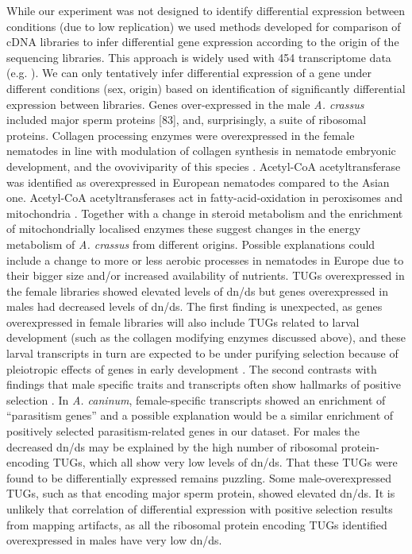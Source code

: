 \documentclass[10pt]{bmc_article}
\newenvironment{bmcformat}{\begin{raggedright}\baselineskip20pt\sloppy\setboolean{publ}{false}}{\end{raggedright}\baselineskip20pt\sloppy}
\begin{document}
\begin{bmcformat}
While our experiment was not designed to identify differential
expression between conditions (due to low replication) we used methods
developed for comparison of cDNA libraries \cite{pmid9331369} to infer
differential gene expression according to the origin of the sequencing
libraries. This approach is widely used with 454 transcriptome data
(e.g. \cite{pmid20470405}). We can only tentatively infer differential
expression of a gene under different conditions (sex, origin) based on
identification of significantly differential expression between
libraries. Genes over-expressed in the male \textit{A. crassus}
included major sperm proteins [83], and, surprisingly, a suite of
ribosomal proteins. Collagen processing enzymes were overexpressed in
the female nematodes in line with modulation of collagen synthesis in
nematode embryonic development, and the ovoviviparity of this species
\cite{pmid10637627}. Acetyl-CoA acetyltransferase was identified as
overexpressed in European nematodes compared to the Asian
one. Acetyl-CoA acetyltransferases act in fatty-acid-oxidation in
peroxisomes and mitochondria \cite{pmid4721607}. Together with a
change in steroid metabolism and the enrichment of mitochondrially
localised enzymes these suggest changes in the energy metabolism of
\textit{A. crassus} from different origins. Possible explanations
could include a change to more or less aerobic processes in nematodes
in Europe due to their bigger size and/or increased availability of
nutrients.  TUGs overexpressed in the female libraries showed elevated
levels of dn/ds but genes overexpressed in males had decreased levels
of dn/ds. The first finding is unexpected, as genes overexpressed in
female libraries will also include TUGs related to larval development
(such as the collagen modifying enzymes discussed above), and these
larval transcripts in turn are expected to be under purifying
selection because of pleiotropic effects of genes in early development
\cite{pmid15371532}. The second contrasts with findings that male
specific traits and transcripts often show hallmarks of positive
selection \cite{pmid15795858, pmid11404480}. In \textit{A. caninum},
female-specific transcripts showed an enrichment of “parasitism
genes'' \cite{pmid20470405} and a possible explanation would be a
similar enrichment of positively selected parasitism-related genes in
our dataset. For males the decreased dn/ds may be explained by the
high number of ribosomal protein-encoding TUGs, which all show very
low levels of dn/ds. That these TUGs were found to be differentially
expressed remains puzzling. Some male-overexpressed TUGs, such as that
encoding major sperm protein, showed elevated dn/ds. It is unlikely
that correlation of differential expression with positive selection
results from mapping artifacts, as all the ribosomal protein encoding
TUGs identified overexpressed in males have
very low dn/ds.\\


\end{bmcformat}
\end{document}

